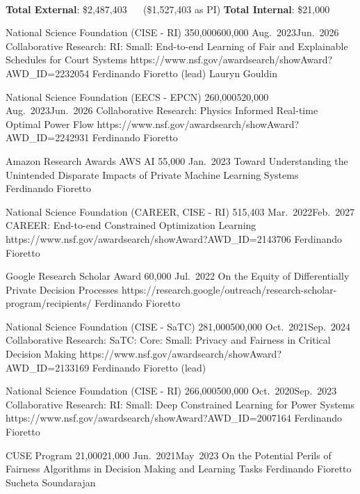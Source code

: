 \
\begin{keywords}
{\textbf{Total External}: \$2,487,403 ~~ (\$1,527,403 as PI) \hspace{8pt} \textbf{Total Internal}: \$21,000}%
\end{keywords}


\begin{projects}
	\grantentrycoPI
	{National Science Foundation (CISE - RI)}
	{350,000}{600,000}
	{Aug.~2023}{Jun.~2026}
	{Collaborative Research: RI: Small: End-to-end Learning of Fair and Explainable Schedules for Court Systems}
	{https://www.nsf.gov/awardsearch/showAward?AWD_ID=2232054}
	{Ferdinando Fioretto (lead)}
	{Lauryn Gouldin}

	\grantentryPI
	{National Science Foundation (EECS - EPCN)}
	{260,000}{520,000}
	{Aug.~2023}{Jun.~2026}
	{Collaborative Research: Physics Informed Real-time Optimal Power Flow}
	{https://www.nsf.gov/awardsearch/showAward?AWD_ID=2242931}
	{Ferdinando Fioretto}

	\grantentrySinglePI
	{Amazon Research Awards AWS AI}
	{55,000}
	{Jan.~2023}{}
	{Toward Understanding the Unintended Disparate Impacts of  Private Machine Learning Systems}
	{~}
	{Ferdinando Fioretto}

	\grantentrySinglePI
	{National Science Foundation (CAREER, CISE - RI)}
	{515,403}
	{Mar.~2022}{Feb.~2027}
	{CAREER: End-to-end Constrained Optimization Learning}
	{https://www.nsf.gov/awardsearch/showAward?AWD_ID=2143706}
	{Ferdinando Fioretto}
	
	\grantentrySinglePI
	{Google Research Scholar Award}
	{60,000}
	{Jul.~2022}{}
	{On the Equity of Differentially Private Decision Processes}
	{https://research.google/outreach/research-scholar-program/recipients/}
	{Ferdinando Fioretto}

	\grantentryPI
	{National Science Foundation (CISE - SaTC)}
	{281,000}{500,000}
	{Oct.~2021}{Sep.~2024}
	{Collaborative Research: SaTC: Core: Small: Privacy and Fairness in Critical Decision Making}
	{https://www.nsf.gov/awardsearch/showAward?AWD_ID=2133169}
	{Ferdinando Fioretto (lead)}
\end{projects}

\begin{projects}
	\grantentryPI
	{National Science Foundation (CISE - RI)}
	{266,000}{500,000}
	{Oct.~2020}{Sep.~2023}
	{Collaborative Research: RI: Small: Deep Constrained Learning for Power Systems}
	{https://www.nsf.gov/awardsearch/showAward?AWD_ID=2007164}
	{Ferdinando Fioretto}

\grantentrycoPI
	{CUSE Program}
	{21,000}{21,000}
	{Jun.~2021}{May~2023}
	{On the Potential Perils of Fairness Algorithms in Decision Making and Learning Tasks}
	{}
	{Ferdinando Fioretto}
	{Sucheta Soundarajan}
\end{projects}

